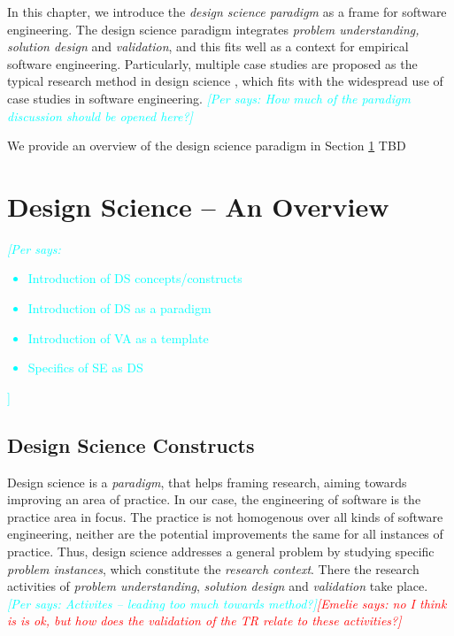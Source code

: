 \documentclass[graybox]{svmult}
\newcommand{\emelie}[1]{\textcolor{red}{{\it [Emelie says: #1]}}}
\newcommand{\per}[1]{\textcolor{cyan}{{\it [Per says: #1]}}}
\newcommand{\emelie}[1]{}
\newcommand{\per}[1]{}
\begin{document}
In this chapter, we introduce the \emph{design science paradigm} as a frame for software engineering. The design science paradigm integrates \emph{problem understanding, solution design} and \emph{validation}, and this fits well as a context for empirical software engineering. Particularly, multiple case studies are proposed as the typical research method in design science \cite{van_aken_management_2004}, which fits with the widespread use of case studies in software engineering. \per{How much of the paradigm discussion should be opened here?}

We provide an overview of the design science paradigm in Section \ref{sec:overview} TBD

\section{Design Science -- An Overview}
\label{sec:overview}
\per{\begin{itemize}
\item Introduction of DS concepts/constructs
\item Introduction of DS as a paradigm
\item Introduction of VA as a template
\item Specifics of SE as DS
\end{itemize}}

\subsection{Design Science Constructs}

Design science is a \emph{paradigm}, that helps framing research, aiming towards improving an area of practice. In our case, the engineering of software is the practice area in focus. The practice is not homogenous over all kinds of software engineering, neither are the potential improvements the same for all instances of practice. Thus, design science addresses a general problem by studying  specific \emph{problem instances}, which constitute the \emph{research context}.  There the research activities of \emph{problem understanding}, \emph{solution design} and \emph{validation} take place. \per{Activites -- leading too much towards method?}\emelie{no I think is is ok, but how does the validation of the TR relate to these activities?}
\end{document}
